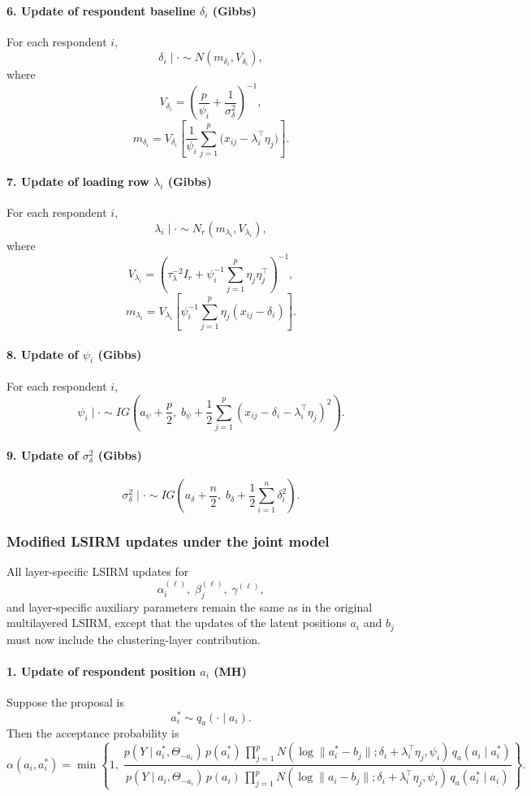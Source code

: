 \paragraph{6. Update of respondent baseline $\delta_i$ (Gibbs)}
For each respondent $i$,
\[
\delta_i \mid \cdot
\sim
N(m_{\delta_i},V_{\delta_i}),
\]
where
\[
V_{\delta_i}
=
\left(
\frac{p}{\psi_i} + \frac{1}{\sigma_\delta^2}
\right)^{-1},
\]
\[
m_{\delta_i}
=
V_{\delta_i}
\left[
\frac{1}{\psi_i}
\sum_{j=1}^p
\bigl(x_{ij}-\lambda_i^\top \eta_j\bigr)
\right].
\]

\paragraph{7. Update of loading row $\lambda_i$ (Gibbs)}
For each respondent $i$,
\[
\lambda_i \mid \cdot
\sim
N_r(m_{\lambda_i},V_{\lambda_i}),
\]
where
\[
V_{\lambda_i}
=
\left(
\tau_\lambda^{-2}I_r
+
\psi_i^{-1}\sum_{j=1}^p \eta_j\eta_j^\top
\right)^{-1},
\]
\[
m_{\lambda_i}
=
V_{\lambda_i}
\left[
\psi_i^{-1}\sum_{j=1}^p \eta_j (x_{ij}-\delta_i)
\right].
\]

\paragraph{8. Update of $\psi_i$ (Gibbs)}
For each respondent $i$,
\[
\psi_i \mid \cdot
\sim
IG\left(
a_\psi + \frac{p}{2},
\;
b_\psi + \frac{1}{2}\sum_{j=1}^p
(x_{ij}-\delta_i-\lambda_i^\top \eta_j)^2
\right).
\]

\paragraph{9. Update of $\sigma_\delta^2$ (Gibbs)}
\[
\sigma_\delta^2 \mid \cdot
\sim
IG\left(
a_\delta + \frac{n}{2},
\;
b_\delta + \frac{1}{2}\sum_{i=1}^n \delta_i^2
\right).
\]

\subsubsection{Modified LSIRM updates under the joint model}

All layer-specific LSIRM updates for
\[
\alpha_i^{(\ell)},\; \beta_j^{(\ell)},\; \gamma^{(\ell)},
\]
and layer-specific auxiliary parameters remain the same as in the original multilayered LSIRM,
except that the updates of the latent positions $a_i$ and $b_j$ must now include the clustering-layer contribution.

\paragraph{1. Update of respondent position $a_i$ (MH)}
Suppose the proposal is
\[
a_i^\ast \sim q_a(\cdot \mid a_i).
\]
Then the acceptance probability is
\[
\alpha(a_i,a_i^\ast)
=
\min\left\{
1,\;
\frac{
p(Y \mid a_i^\ast,\Theta_{-a_i})
\, p(a_i^\ast)
\, \prod_{j=1}^p
N\!\left(\log\|a_i^\ast-b_j\|;\delta_i+\lambda_i^\top\eta_j,\psi_i\right)
\, q_a(a_i \mid a_i^\ast)
}{
p(Y \mid a_i,\Theta_{-a_i})
\, p(a_i)
\, \prod_{j=1}^p
N\!\left(\log\|a_i-b_j\|;\delta_i+\lambda_i^\top\eta_j,\psi_i\right)
\, q_a(a_i^\ast \mid a_i)
}
\right\}.
\]

